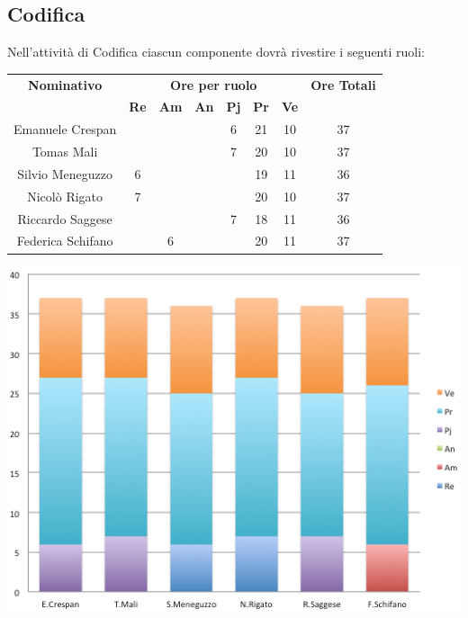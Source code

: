 \subsection{Codifica}
Nell'attività di Codifica ciascun componente dovrà rivestire i seguenti ruoli:
\begin{center}
  \centering
  \begin{tabular} {|c|c|c|c|c|c|c|c|}
    \hline
    \textbf{Nominativo} & \multicolumn{6}{|c|}{\textbf{Ore per ruolo}} & \textbf{Ore Totali} \\
    & \textbf{Re} & \textbf{Am} & \textbf{An} & \textbf{Pj} & \textbf{Pr} & \textbf{Ve} & \\
    \hline
    Emanuele Crespan & & & &6 &21 &10 &37\\
    \hline
    Tomas Mali & & & &7 &20 &10 &37\\
    \hline
    Silvio Meneguzzo &6 & & & &19 &11 &36\\
    \hline
    Nicolò Rigato &7 & & & &20 &10 &37\\
    \hline
    Riccardo Saggese & & & &7 &18 &11 &36\\
    \hline
    Federica Schifano & &6 & & &20 &11 &37\\
    \hline
  \end{tabular}
  \includegraphics[scale=0.65]{img/fig5.png}
\end{center}

